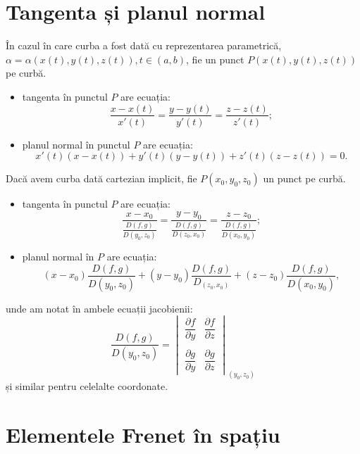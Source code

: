 
\section{Tangenta și planul normal}

În cazul în care curba a fost dată cu reprezentarea parametrică,
$ \alpha = \alpha(x(t), y(t), z(t)), t \in (a, b) $, fie un punct
$ P(x(t), y(t), z(t)) $ pe curbă.

\begin{itemize}
  \item tangenta în punctul $ P $ are ecuația:
    \[
      \dfrac{x - x(t)}{x'(t)} = \dfrac{y - y(t)}{y'(t)} = \dfrac{z - z(t)}{z'(t)};
    \]
  \item planul normal în punctul $ P $ are ecuația:
    \[
      x'(t)(x - x(t)) + y'(t)(y - y(t)) + z'(t)(z - z(t)) = 0.
    \]
\end{itemize}

Dacă avem curba dată cartezian implicit, fie $ P(x_0, y_0, z_0) $ un punct
pe curbă.
\begin{itemize}
  \item tangenta în punctul $ P $ are ecuația:
    \[
      \dfrac{x - x_0}{\frac{D(f, g)}{D(y_0, z_0)}} = %
      \dfrac{y - y_0}{\frac{D(f, g)}{D(z_0, x_0)}} = %
      \dfrac{z - z_0}{\frac{D(f, g)}{D(x_0, y_0)}};
    \]
  \item planul normal în $ P $ are ecuația:
    \[
      (x - x_0) \dfrac{D(f, g)}{D(y_0, z_0)} + (y - y_0) \dfrac{D(f, g)}{D_(z_0, x_0)} + %
      (z - z_0) \dfrac{D(f, g)}{D(x_0, y_0)},
    \]
\end{itemize}

unde am notat în ambele ecuații jacobienii:
\[
  \dfrac{D(f, g)}{D(y_0, z_0)} = \begin{vmatrix}
  \dfrac{\partial f}{\partial y} & \dfrac{\partial f}{\partial z} \\
                                 & \\
  \dfrac{\partial g}{\partial y} & \dfrac{\partial g}{\partial z}
\end{vmatrix}_{(y_0, z_0)}
\]
și similar pentru celelalte coordonate.


\section{Elementele Frenet în spațiu}

